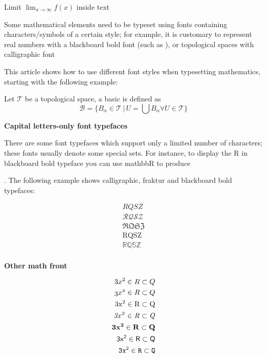 \documentclass[12pt, letterpaper]{article}
\begin{document}
\medskip

Limit $\lim_{x\to\infty} f(x)$ inside text


Some mathematical elements need to be typeset using fonts containing characters/symbols of a certain style; for example, it is customary to represent real numbers with a blackboard bold font (such as ), or topological spaces with calligraphic font 

This article shows how to use different font styles when typesetting mathematics, starting with the following example:

Let \(\mathcal{T}\) be a topological space, a basic is defined 
as 
\[
    \mathcal{B} = \{B_{\alpha} \in \mathcal{T}\, |\,  U=\bigcup B_{\alpha} \forall  U \in \mathcal{T} \}
\]

\newpage

\textbf{Capital letters-only font typefaces}

There are some font typefaces which support only a limited number of characters; these fonts usually denote some special sets. For instance, to display the R in blackboard bold typeface you can use mathbb{R} to produce 

. The following example shows calligraphic, fraktur and blackboard bold typefaces:




\begin{align}
RQSZ \\
\mathcal{RQSZ} \\
\mathfrak{RQSZ} \\
\mathrm{RQSZ} \\
\mathbb{RQSZ}\\
\end{align}

\textbf{Other math front }

\begin{align*}
3x^2 \in R \subset Q \\
\mathnormal{3x^2 \in R \subset Q} \\
\mathrm{3x^2 \in R \subset Q} \\
\mathit{3x^2 \in R \subset Q} \\
\mathbf{3x^2 \in R \subset Q} \\
\mathsf{3x^2 \in R \subset Q} \\
\mathtt{3x^2 \in R \subset Q}
\end{align*}
\end{document}
